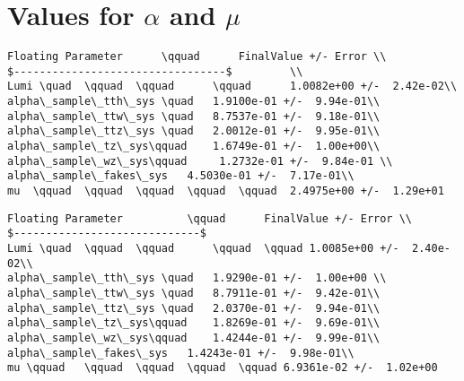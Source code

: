 \chapter{Values for \protect \texorpdfstring{$\alpha$ and $\mu$}{and}}
\begin{verbatim}
Floating Parameter		\qquad		FinalValue +/- Error \\
$---------------------------------$			\\
Lumi \quad	\qquad	\qquad		\qquad		1.0082e+00 +/-  2.42e-02\\
alpha\_sample\_tth\_sys	\quad	1.9100e-01 +/-  9.94e-01\\
alpha\_sample\_ttw\_sys	\quad	8.7537e-01 +/-  9.18e-01\\
alpha\_sample\_ttz\_sys	\quad	2.0012e-01 +/-  9.95e-01\\
alpha\_sample\_tz\_sys\qquad	1.6749e-01 +/-  1.00e+00\\
alpha\_sample\_wz\_sys\qquad	 1.2732e-01 +/-  9.84e-01 \\
alpha\_sample\_fakes\_sys	4.5030e-01 +/-  7.17e-01\\
mu 	\qquad	\qquad	\qquad	\qquad	\qquad	2.4975e+00 +/-  1.29e+01
\end{verbatim}


\begin{verbatim}
Floating Parameter			\qquad		FinalValue +/- Error \\
$-----------------------------$
Lumi \quad	\qquad	\qquad		\qquad	\qquad 1.0085e+00 +/-  2.40e-02\\
alpha\_sample\_tth\_sys	\quad	1.9290e-01 +/-  1.00e+00 \\
alpha\_sample\_ttw\_sys	\quad	8.7911e-01 +/-  9.42e-01\\
alpha\_sample\_ttz\_sys	\quad	2.0370e-01 +/-  9.94e-01\\
alpha\_sample\_tz\_sys\qquad	1.8269e-01 +/-  9.69e-01\\
alpha\_sample\_wz\_sys\qquad	1.4244e-01 +/-  9.99e-01\\
alpha\_sample\_fakes\_sys	1.4243e-01 +/-  9.98e-01\\
mu \qquad	\qquad	\qquad	\qquad	\qquad 6.9361e-02 +/-  1.02e+00
\end{verbatim}
